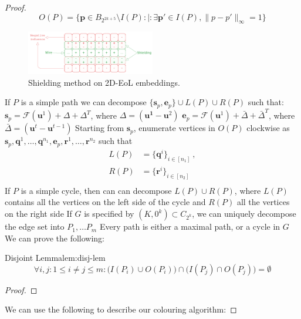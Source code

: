 \begin{proof}
    $$
        O(P) = \{  \mathbf{p} \in B_{2^{2k+5}} \setminus I(P) :\mid: \exists \mathbf{p}' \in I(P), \|p- p'\|_{\infty} = 1 \}
    $$

    \begin{figure}
        \centering
        \includegraphics[width=0.5\textwidth]{Chapter3/coiling-eol.pdf}
        \caption{Shielding method on 2D-EoL embeddings.}
        \label{fig:chap-3:eol-shielding}
    \end{figure}
    If $P$ is a simple path we can decompose $\{ \mathbf{s}_{p}, \mathbf{e}_{p} \} \cup L(P) \cup R(P)$ such that:
    $\mathbf{s}_{p} = \mathcal{F}(\mathbf{u}^1) + \Delta + \Delta^T$, where $\Delta = (\mathbf{u^1}- \mathbf{u}^2)$
    $\mathbf{e}_{p} = \mathcal{F}(\mathbf{u}^1) + \bar{\Delta} + \bar{{\Delta}}^T$, where $\bar{\Delta}= (\mathbf{u}^t - \mathbf{u}^{t-1})$
    Starting from $\mathbf{s}_{p}$,
    enumerate vertices in $O(P)$ clockwise as $\mathbf{s}_{p},\mathbf{q}^1,\dots,\mathbf{q}^{n_{1}}, \mathbf{e}_{p}, \mathbf{r}^1,\dots,\mathbf{r}^{n_{2}}$ such that
    \begin{align*}
        L(P) & = \{ \mathbf{q}^i \}_{i \in [n_{1}]}\ , \\
        R(P) & = \{ \mathbf{r}^i \}_{i \in [n_{2}]}\,  \\
    \end{align*}
    If $P$ is a simple cycle, then can can decompose $L(P) \cup R(P)$, where $L(P)$ contains all the vertices on the left side of the cycle and $R(P)$ all the vertices on the right side
    If $G$ is specified by $(K, 0^k) \subset C_{2^k}$, we can uniquely decompose the edge set into $P_{1}, \dots P_{m}$
    Every path is either a maximal path, or a cycle in $G$
    We can prove the following:
    \begin{lemmabox}{Disjoint Lemma}{lem:disj-lem}
        $$
            \forall i ,j : 1\leq i\neq j \leq m : \Big(I(P_{i}) \cup O(P_{i})\Big) \cap \Big( I(P_{j}) \cap O(P_{j}) \Big) = \emptyset
        $$
    \end{lemmabox}
    \begin{proof}
    \end{proof}

    We can use the following to describe our colouring algorithm:


\end{proof}
